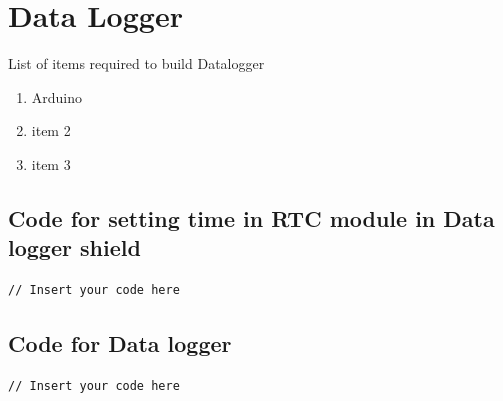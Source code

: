 \newpage
\chapter{Data Logger}

List of items required to build Datalogger

\begin{enumerate}
	\item Arduino
	\item item 2
	\item item 3
\end{enumerate} 

\section*{Code for setting time in RTC module in Data logger shield}

\begin{lstlisting}[caption={RTC}, label={lst:RTC_set}]
// Insert your code here

\end{lstlisting}

\section*{Code for Data logger}

\begin{lstlisting}[caption={Data Logging Code}, label={lst:datalogger_full}]
// Insert your code here

\end{lstlisting}
